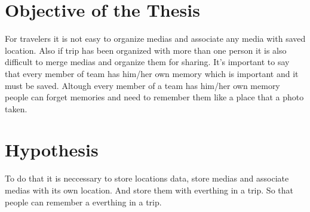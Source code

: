 \section{Objective of the Thesis}
For travelers it is not easy to organize medias and associate any media with saved location. Also if trip has been organized with more than one person it is also difficult to merge medias and organize them for sharing. It's important to say that every member of team has him/her own memory which is important and it must be saved. Altough every member of a team has him/her own memory people can forget memories and need to remember them like a place that a photo taken.

\section{Hypothesis}
To do that it is neccessary to store locations data, store medias and associate medias with its own location. And store them with everthing in a trip. So that people can remember a everthing in a trip.